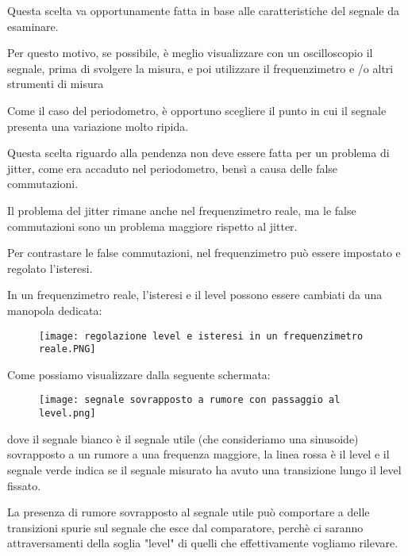 Questa scelta va opportunamente fatta in base alle caratteristiche del segnale da esaminare. \newline 

\begin{tcolorbox}
    Per questo motivo, se possibile, è meglio visualizzare con un oscilloscopio il segnale, prima di svolgere la misura, e poi utilizzare il frequenzimetro e /o altri strumenti di misura
\end{tcolorbox}

Come il caso del periodometro, è opportuno scegliere il punto in cui il segnale presenta una variazione molto ripida. \newline 

Questa scelta riguardo alla pendenza non deve essere fatta per un problema di jitter, 
come era accaduto nel periodometro, 
bensì a causa delle false commutazioni. \newline 

Il problema del jitter rimane anche nel frequenzimetro reale, ma le false commutazioni sono un problema maggiore rispetto al jitter. \newline 

Per contrastare le false commutazioni, nel frequenzimetro può essere impostato e regolato l'isteresi. \newline 

In un frequenzimetro reale, l'isteresi e il level possono essere cambiati da una manopola dedicata: 

\begin{figure}[h]
    \centering
    \texttt{[image: regolazione level e isteresi in un frequenzimetro reale.PNG]}
\end{figure}

Come possiamo visualizzare dalla seguente schermata: 

\begin{figure}[h]
    \centering
    \texttt{[image: segnale sovrapposto a rumore con passaggio al level.png]}
\end{figure}

dove il segnale bianco è il segnale utile (che consideriamo una sinusoide) sovrapposto a un rumore a una frequenza maggiore, 
la linea rossa è il level e il segnale verde indica se il segnale misurato ha avuto una transizione lungo il level fissato. \newline 

La presenza di rumore sovrapposto al segnale utile può comportare a delle transizioni spurie sul segnale che esce dal comparatore, 
perchè ci saranno attraversamenti della soglia "level" di quelli che effettivamente vogliamo rilevare. \newline 

